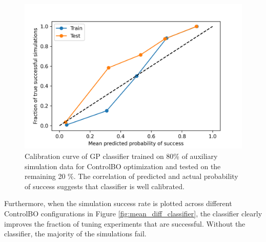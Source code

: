\begin{figure}
    \centering
    \includegraphics[width=\textwidth]{gfx/Chapter06/classifier_calibration.png}
    \caption{Calibration curve of GP classifier trained on 80\% of auxiliary simulation data for ControlBO optimization and tested on the remaining 20 \%. The correlation of predicted and actual probability of success suggests that classifier is well calibrated.}
    \label{fig:classifier_calibration}
\end{figure}

Furthermore, when the simulation success rate is plotted across different ControlBO configurations in Figure \ref{fig:mean_diff_classifier}, the classifier clearly improves the fraction of tuning experiments that are successful. Without the classifier, the majority of the simulations fail.  

